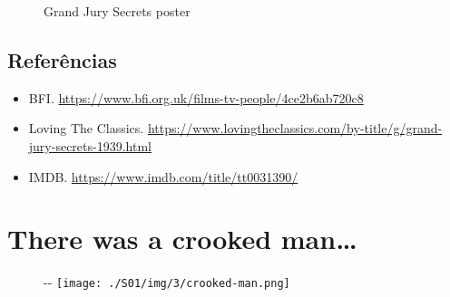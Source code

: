 \begin{figure}
  \centering
    \caption{Grand Jury Secrets poster\label{fig:grand-jury-secrets-poster}}
\end{figure}

\hypertarget{referuxeancias-1}{%
\subsection{Referências}\label{referuxeancias-1}}

\begin{itemize}
\tightlist
\item
  \sloppy BFI. \url{https://www.bfi.org.uk/films-tv-people/4ce2b6ab720c8}
\item
  \sloppy Loving The Classics. \url{https://www.lovingtheclassics.com/by-title/g/grand-jury-secrets-1939.html}
\item
  \sloppy IMDB. \url{https://www.imdb.com/title/tt0031390/}
\end{itemize}

\hypertarget{there-was-a-crooked-man}{%
\section{There was a crooked
man\ldots{}}\label{there-was-a-crooked-man}}

\begin{figure}[!ht]
  \begin{adjustwidth}{-\oddsidemargin-1in}{-\rightmargin}
    \centering
    \texttt{[image: ./S01/img/3/crooked-man.png]}
  \end{adjustwidth}
\end{figure}

